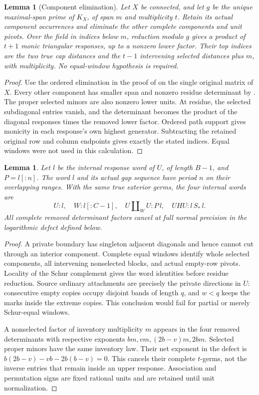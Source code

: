 \documentclass[11pt,a4paper]{amsart}
\numberwithin{equation}{section}
\theoremstyle{plain}
\newtheorem{lemma}[theorem]{Lemma}
\theoremstyle{definition}
\begin{document}
\begin{lemma}[Component elimination]\label{lem:component-elimination}
Let \(X\) be connected, and let \(g\) be the unique maximal-span prime of \(K_X\), of span \(m\) and multiplicity \(t\).  Retain its actual component occurrences and eliminate the other complete components and unit pivots.  Over the field in indices below \(m\), reduction modulo \(g\) gives a product of \(t+1\) monic triangular responses, up to a nonzero lower factor.  Their top indices are the two true cap distances and the \(t-1\) intervening selected distances plus \(m\), with multiplicity.  No equal-window hypothesis is required.
\end{lemma}
\begin{proof}
Use the ordered elimination in the proof of  on the single original matrix of \(X\).  Every other component has smaller span and nonzero residue determinant by .  The proper selected minors are also nonzero lower units.  At residue, the selected subdiagonal entries vanish, and the determinant becomes the product of the diagonal responses times the removed lower factor.  Ordered path support gives monicity in each response's own highest generator.  Subtracting the retained original row and column endpoints gives exactly the stated indices.  Equal windows were not used in this calculation.
\end{proof}

\begin{lemma}\label{lem:actual-words}
Let \(l\) be the internal response word of \(U\), of length \(B-1\), and \(P=l[:n]\).  The word \(l\) and its actual gap sequence have period \(n\) on their overlapping ranges.  With the same true exterior germs, the four internal words are
\[
 U:l,\quad W:l[:C-1],\quad
 U\amalg_W U:P\,l,\quad UHU:l\,S_*\,l.
\]
All complete removed determinant factors cancel at full normal precision in the logarithmic defect defined below.
\end{lemma}
\begin{proof}
A private boundary has singleton adjacent diagonals and hence cannot cut through an interior component.  Complete equal windows identify whole selected components, all intervening nonselected blocks, and actual empty-row pivots.  Locality of the Schur complement gives the word identities before residue reduction.  Source ordinary attachments are precisely the private directions in \(U\): consecutive empty copies occupy disjoint bands of length \(q\), and \(w<q\) keeps the marks inside the extreme copies.  This conclusion would fail for partial or merely Schur-equal windows.

A nonselected factor of inventory multiplicity \(m\) appears in the four removed determinants with respective exponents \(bm,vm,(2b-v)m,2bm\).  Selected proper minors have the same inventory law.  Their net exponent in the defect is
\(b(2b-v)-vb-2b(b-v)=0\).  This cancels their complete \(t\)-germs, not the inverse entries that remain inside an upper response.  Association and permutation signs are fixed rational units and are retained until unit normalization.
\end{proof}
\end{document}
